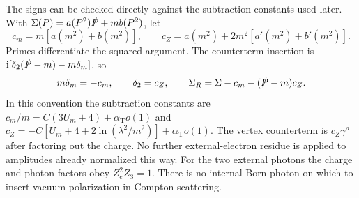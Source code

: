 The signs can be checked directly against the subtraction constants
used later. With $\Sigma(P)=a(P^2)\slashed P+mb(P^2)$, let
\begin{equation}
 c_m=m[a(m^2)+b(m^2)],\qquad
 c_Z=a(m^2)+2m^2[a'(m^2)+b'(m^2)].
\end{equation}
Primes differentiate the squared argument. The counterterm insertion
is $\mathrm{i}[\delta_2(\slashed P-m)-m\delta_m]$, so
\begin{equation}
 m\delta_m=-c_m,\qquad \delta_2=c_Z,\qquad
 \Sigma_R=\Sigma-c_m-(\slashed P-m)c_Z.
 \label{eq:comp-overview-subtractions}
\end{equation}
In this convention the subtraction constants are
$c_m/m=C(3U_m+4)+\alpha_{\mathrm T}o(1)$ and
$c_Z=-C[U_m+4+2\ln(\lambda^2/m^2)]+\alpha_{\mathrm T}o(1)$.
The vertex counterterm is $c_Z\gamma^\rho$ after factoring out the
charge. No further external-electron residue is applied to amplitudes
already normalized this way. For the two external photons the charge
and photon factors obey $Z_e^2Z_3=1$. There is no internal Born photon
on which to insert vacuum polarization in Compton scattering.

